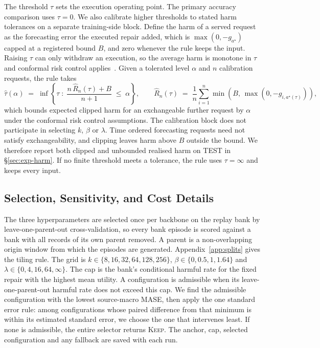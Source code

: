\documentclass{article}
\begin{document}
The threshold $\tau$ sets the execution operating point. The primary accuracy comparison
uses $\tau=0$. We also calibrate higher thresholds to stated harm tolerances on a separate
training-side block. Define the harm of a served request as the
forecasting error the executed repair added, which is $\max(0, -g_{a^{\star}})$ capped at a
registered bound $B$, and zero whenever the rule keeps the input. Raising $\tau$ can only
withdraw an execution, so the average harm is monotone in $\tau$ and conformal risk
control applies~\citep{angelopoulos2024conformal}. Given a tolerated
level $\alpha$ and $n$ calibration requests, the rule takes
\begin{equation}
  \hat\tau(\alpha) \;=\; \inf\left\{ \tau \;:\;
    \frac{n\, \hat{R}_n(\tau) + B}{n+1} \;\le\; \alpha \right\},
  \qquad
  \hat{R}_n(\tau) \;=\; \frac{1}{n}\sum_{i=1}^{n} \min\!\left(B,\, \max(0, -g_{i,a^{\star}(\tau)})\right),
  \label{eq:crc}
\end{equation}
which bounds expected clipped harm for an exchangeable further request by $\alpha$ under
the conformal risk control assumptions. The calibration block does not participate in
selecting $k$, $\beta$ or $\lambda$. Time ordered forecasting requests need not satisfy
exchangeability, and clipping leaves harm above $B$ outside the bound. We therefore report
both clipped and unbounded realised harm on TEST in \S\ref{sec:exp-harm}. If no finite
threshold meets a tolerance, the rule uses $\tau=\infty$ and keeps every input.




\subsection{Selection, Sensitivity, and Cost Details}
The three hyperparameters are selected once per backbone on the replay bank by
leave-one-parent-out cross-validation, so every bank episode is scored against a bank with all
records of its own parent removed. A parent is a non-overlapping origin window from which the
episodes are generated. Appendix~\ref{app:splits} gives the tiling rule. The grid is
$k \in \{8,16,32,64,128,256\}$, $\beta \in \{0,0.5,1,1.64\}$ and
$\lambda \in \{0,4,16,64,\infty\}$. The cap is the bank's conditional harmful rate for
the fixed repair with the highest mean utility. A configuration is admissible when its
leave-one-parent-out harmful rate does not exceed this cap. We find the admissible
configuration with the lowest source-macro MASE, then apply the one standard error rule:
among configurations whose paired difference from that minimum is within its estimated
standard error, we choose the one that intervenes least. If none is admissible, the entire
selector returns \textsc{Keep}. The anchor, cap, selected configuration and any fallback
are saved with each run.
\end{document}

